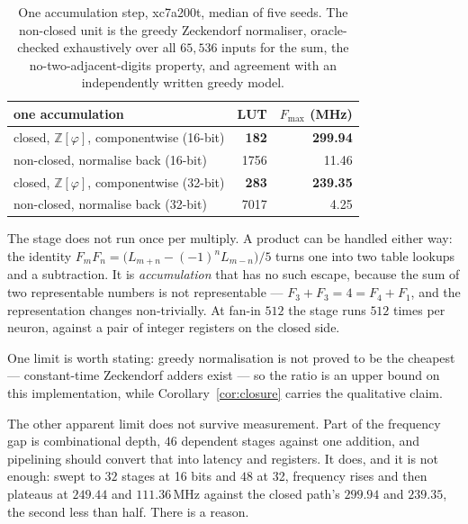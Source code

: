 \documentclass[11pt]{article}
\theoremstyle{definition}
\begin{document}
\begin{table}[t]\centering
\caption{One accumulation step, xc7a200t, median of five seeds. The non-closed
unit is the greedy Zeckendorf normaliser, oracle-checked exhaustively over all
$65{,}536$ inputs for the sum, the no-two-adjacent-digits property, and
agreement with an independently written greedy model.}
\label{tab:closure}
\begin{tabular}{lrr}
\toprule
one accumulation & LUT & $F_{\max}$ (MHz) \\
\midrule
closed, $\mathbb{Z}[\varphi]$, componentwise (16-bit) & \textbf{182} & \textbf{299.94} \\
non-closed, normalise back (16-bit)                   & 1756 & 11.46 \\
\addlinespace
closed, $\mathbb{Z}[\varphi]$, componentwise (32-bit) & \textbf{283} & \textbf{239.35} \\
non-closed, normalise back (32-bit)                   & 7017 & 4.25 \\
\bottomrule
\end{tabular}
\end{table}

The stage does not run once per multiply. A product can be handled either way:
the identity $F_mF_n = \bigl(L_{m+n}-(-1)^nL_{m-n}\bigr)/5$ turns one into two
table lookups and a subtraction. It is \emph{accumulation} that has no such
escape, because the sum of two representable numbers is not representable ---
$F_3+F_3 = 4 = F_4+F_1$, and the representation changes non-trivially. At fan-in
$512$ the stage runs $512$ times per neuron, against a pair of integer registers
on the closed side.

One limit is worth stating: greedy normalisation is not proved to be the
cheapest --- constant-time Zeckendorf adders exist --- so the ratio is an upper
bound on this implementation, while Corollary~\ref{cor:closure} carries the
qualitative claim.

The other apparent limit does not survive measurement. Part of the frequency gap
is combinational depth, $46$ dependent stages against one addition, and
pipelining should convert that into latency and registers. It does, and it is
not enough: swept to $32$ stages at 16 bits and $48$ at 32, frequency rises and
then plateaus at $249.44$ and $111.36$\,MHz against the closed path's $299.94$
and $239.35$, the second less than half. There is a reason.
\end{document}
